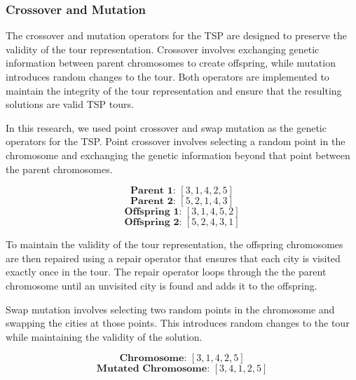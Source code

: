 \documentclass[conference]{IEEEtran}
\begin{document}
\subsubsection{Crossover and Mutation}
The crossover and mutation operators for the TSP are designed to preserve the
validity of the tour representation. Crossover involves exchanging genetic
information between parent chromosomes to create offspring, while mutation
introduces random changes to the tour. Both operators are implemented to
maintain the integrity of the tour representation and ensure that the resulting
solutions are valid TSP tours.

In this research, we used point crossover and swap mutation as the genetic
operators for the TSP. Point crossover involves selecting a random point in the
chromosome and exchanging the genetic information beyond that point between the
parent chromosomes.

\begin{equation*}
    \textbf{Parent 1: } [3, 1, 4, 2, 5]
\end{equation*}
\begin{equation*}
    \textbf{Parent 2: } [5, 2, 1, 4, 3]
\end{equation*}
\begin{equation*}
    \textbf{Offspring 1: } [3, 1, 4, 5, 2]
\end{equation*}
\begin{equation*}
    \textbf{Offspring 2: } [5, 2, 4, 3, 1]
\end{equation*}

To maintain the validity of the tour representation, the offspring chromosomes
are then repaired using a repair operator that ensures that each city is
visited exactly once in the tour. The repair operator loops through the the
parent chromosome until an unvisited city is found and adds it to the
offspring.

Swap mutation involves selecting two random points in the chromosome and
swapping the cities at those points. This introduces random changes to the tour
while maintaining the validity of the solution.

\begin{equation*}
    \textbf{Chromosome: } [3, 1, 4, 2, 5]
\end{equation*}
\begin{equation*}
    \textbf{Mutated Chromosome: } [3, 4, 1, 2, 5]
\end{equation*}
\end{document}
